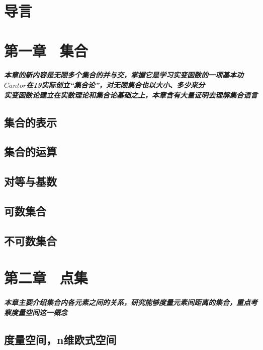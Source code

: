 \documentclass[oneside]{book} %
\begin{document}
 

\tableofcontents %
\chapter{导言}

\chapter{第一章 \ 集合}
\paragraph{
本章的新内容是无限多个集合的并与交，掌握它是学习实变函数的一项基本功
\\
$Cantor$在19实际创立“集合论”，对无限集合也以大小、多少来分
\\
实变函数论建立在实数理论和集合论基础之上，本章含有大量证明去理解集合语言}
\newpage
\section{集合的表示} 

\newpage
\section{集合的运算}

\newpage
\section{对等与基数}

\newpage
\section{可数集合}

\newpage
\section{不可数集合}


\chapter{第二章 \ 点集}
\paragraph{
本章主要介绍集合内各元素之间的关系，研究能够度量元素间距离的集合，重点考察度量空间这一概念
}

\newpage 
\section{度量空间，n维欧式空间}

\newpage
\end{document}

